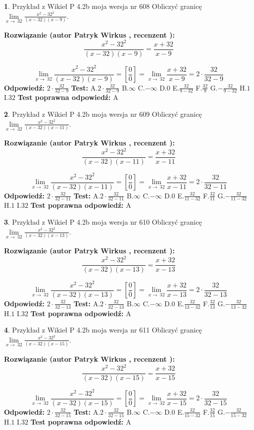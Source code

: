 \documentclass[12pt, a4paper]{article}
\theoremstyle{definition} %
\newtheorem{zad}{}
\newcommand{\zadStart}[1]{\begin{zad}#1\newline}
\newcommand{\zadStop}{\end{zad}}
\newcommand{\rozwStart}[2]{\noindent \textbf{Rozwiązanie (autor #1 , recenzent #2): }\newline}
\newcommand{\rozwStop}{\newline}
\newcommand{\odpStart}{\noindent \textbf{Odpowiedź:}\newline}
\newcommand{\odpStop}{\newline}
\newcommand{\testStart}{\noindent \textbf{Test:}\newline}
\newcommand{\testStop}{\newline}
\newcommand{\kluczStart}{\noindent \textbf{Test poprawna odpowiedź:}\newline}
\newcommand{\kluczStop}{\newline}
\begin{document}
\zadStart{Przykład z Wikieł P 4.2b moja wersja nr 608}
Obliczyć granicę $\lim\limits_{x\to\ 32}\frac{x^{2}-32^{2}}{(x-32)(x-9)}$.
\zadStop
\rozwStart{Patryk Wirkus}{}
$$\frac{x^{2}-32^{2}}{(x-32)(x-9)}=\frac{x+32}{x-9}$$

$$\lim\limits_{x\to\ 32}\frac{x^{2}-32^{2}}{(x-32)(x-9)}=[\frac{0}{0}]=\lim\limits_{x\to\ 32}\frac{x+32}{x-9}=2 \cdot \frac{32}{32-9}$$
\rozwStop
\odpStart
$2 \cdot \frac{32}{32-9}$
\odpStop
\testStart
A.$2 \cdot \frac{32}{32-9}$
B.$\infty$
C.$-\infty$
D.$0$
E.$\frac{32}{9-32}$
F.$\frac{32}{9}$
G.$-\frac{32}{9-32}$
H.$1$
I.$32$
\testStop
\kluczStart
A
\kluczStop



\zadStart{Przykład z Wikieł P 4.2b moja wersja nr 609}
Obliczyć granicę $\lim\limits_{x\to\ 32}\frac{x^{2}-32^{2}}{(x-32)(x-11)}$.
\zadStop
\rozwStart{Patryk Wirkus}{}
$$\frac{x^{2}-32^{2}}{(x-32)(x-11)}=\frac{x+32}{x-11}$$

$$\lim\limits_{x\to\ 32}\frac{x^{2}-32^{2}}{(x-32)(x-11)}=[\frac{0}{0}]=\lim\limits_{x\to\ 32}\frac{x+32}{x-11}=2 \cdot \frac{32}{32-11}$$
\rozwStop
\odpStart
$2 \cdot \frac{32}{32-11}$
\odpStop
\testStart
A.$2 \cdot \frac{32}{32-11}$
B.$\infty$
C.$-\infty$
D.$0$
E.$\frac{32}{11-32}$
F.$\frac{32}{11}$
G.$-\frac{32}{11-32}$
H.$1$
I.$32$
\testStop
\kluczStart
A
\kluczStop



\zadStart{Przykład z Wikieł P 4.2b moja wersja nr 610}
Obliczyć granicę $\lim\limits_{x\to\ 32}\frac{x^{2}-32^{2}}{(x-32)(x-13)}$.
\zadStop
\rozwStart{Patryk Wirkus}{}
$$\frac{x^{2}-32^{2}}{(x-32)(x-13)}=\frac{x+32}{x-13}$$

$$\lim\limits_{x\to\ 32}\frac{x^{2}-32^{2}}{(x-32)(x-13)}=[\frac{0}{0}]=\lim\limits_{x\to\ 32}\frac{x+32}{x-13}=2 \cdot \frac{32}{32-13}$$
\rozwStop
\odpStart
$2 \cdot \frac{32}{32-13}$
\odpStop
\testStart
A.$2 \cdot \frac{32}{32-13}$
B.$\infty$
C.$-\infty$
D.$0$
E.$\frac{32}{13-32}$
F.$\frac{32}{13}$
G.$-\frac{32}{13-32}$
H.$1$
I.$32$
\testStop
\kluczStart
A
\kluczStop



\zadStart{Przykład z Wikieł P 4.2b moja wersja nr 611}
Obliczyć granicę $\lim\limits_{x\to\ 32}\frac{x^{2}-32^{2}}{(x-32)(x-15)}$.
\zadStop
\rozwStart{Patryk Wirkus}{}
$$\frac{x^{2}-32^{2}}{(x-32)(x-15)}=\frac{x+32}{x-15}$$

$$\lim\limits_{x\to\ 32}\frac{x^{2}-32^{2}}{(x-32)(x-15)}=[\frac{0}{0}]=\lim\limits_{x\to\ 32}\frac{x+32}{x-15}=2 \cdot \frac{32}{32-15}$$
\rozwStop
\odpStart
$2 \cdot \frac{32}{32-15}$
\odpStop
\testStart
A.$2 \cdot \frac{32}{32-15}$
B.$\infty$
C.$-\infty$
D.$0$
E.$\frac{32}{15-32}$
F.$\frac{32}{15}$
G.$-\frac{32}{15-32}$
H.$1$
I.$32$
\testStop
\kluczStart
A
\kluczStop
\end{document}
